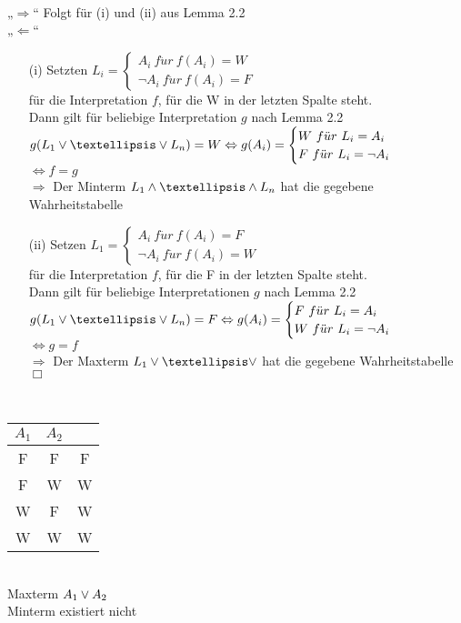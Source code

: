 \beweis{}\\
„$\Rightarrow$“ Folgt für (i) und (ii) aus Lemma 2.2\\
„$\Leftarrow$“ 
\begin{enumerate}
\item[(i)] Setzten $L_i = \begin{cases} A_i\ f\ddot{u}r\ f(A_i) = W \\ \neg A_i\ f\ddot{u}r\ f(A_i) = F \end{cases}$\\
für die Interpretation $f$, für die W in der letzten Spalte steht.\\
Dann gilt für beliebige Interpretation $g$ nach Lemma 2.2 \\
$g(L_1 \OR … \OR L_n) = W \Leftrightarrow g(A_i) = \begin{cases} W\ f\ddot{u}r\ L_i = A_i \\ F\ f\ddot{u}r\ L_i = \neg A_i \end{cases}$\\
$\Leftrightarrow f = g$\\
$\Rightarrow$ Der Minterm $L_1 \AND … \AND L_n$ hat die gegebene Wahrheitstabelle

\item[(ii)] Setzen $L_1 = \begin{cases} A_i\ f\ddot{u}r\ f(A_i) = F \\ \neg A_i\ f\ddot{u}r\ f(A_i) = W \end{cases}$\\
für die Interpretation $f$, für die F in der letzten Spalte steht.\\
Dann gilt für beliebige Interpretationen $g$ nach Lemma 2.2\\
$g(L_1 \OR … \OR L_n) = F \Leftrightarrow g(A_i) = \begin{cases} F\ f\ddot{u}r\ L_i = A_i \\ W\ f\ddot{u}r\ L_i = \neg A_i \end{cases}$\\
$\Leftrightarrow g = f$\\
$\Rightarrow$ Der Maxterm $L_1 \OR … \OR$ hat die gegebene Wahrheitstabelle $\Box$

\end{enumerate}

\beispiel{}\\
\begin{tabular}{c|c|c}
$A_1$ & $A_2$ &  \\
\hline
F & F & F \\
F & W & W \\
W & F & W \\
W & W & W \\
\end{tabular}\\
Maxterm $A_1 \vee A_2 $\\
Minterm existiert nicht

